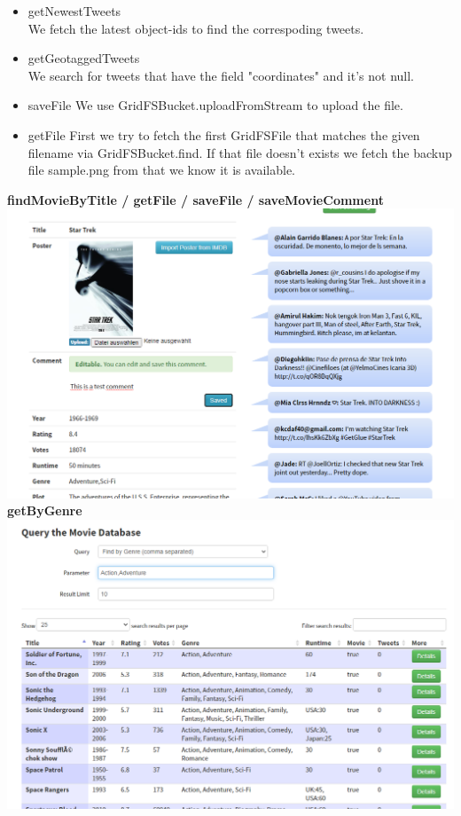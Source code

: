 \documentclass[a4paper,english,abstract=on]{scrartcl}
\begin{document}
\begin{itemize}
	\item {\ttconsolas getNewestTweets}\\
	We fetch the latest object-ids to find the correspoding tweets.
	\item {\ttconsolas getGeotaggedTweets}\\
	We search for tweets that have the field {\ttconsolas "coordinates"} and it's not null.
	\item {\ttconsolas saveFile}
	We use {\ttconsolas GridFSBucket.uploadFromStream} to upload the file.
	\item {\ttconsolas getFile}
	First we try to fetch the first GridFSFile that matches the given filename via {\ttconsolas GridFSBucket.find}. If that file doesn't exists we fetch the backup file {\ttconsolas sample.png} from that we know it is available.
\end{itemize}
\textbf{findMovieByTitle / getFile / saveFile / saveMovieComment}\\
\includegraphics[width=\textwidth,height=\textheight,keepaspectratio]{startrek.png}\\
\newpage
\textbf{getByGenre}\\
\includegraphics[width=\textwidth,height=\textheight,keepaspectratio]{search_genre_list.png}\\
\end{document}
